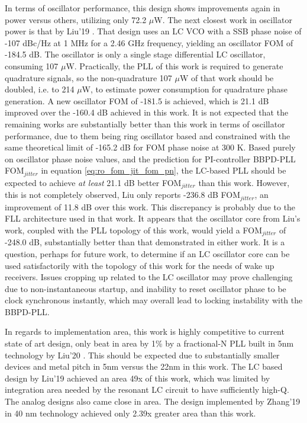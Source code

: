 In terms of oscillator performance, this design shows improvements again in power versus others, utilizing only 72.2 $\mu$W. The next closest work in oscillator power is that by Liu'19 \cite{Liu2019}. That design uses an LC VCO with a SSB phase noise of -107 dBc/Hz at 1 MHz for a 2.46 GHz frequency, yielding an oscillator FOM of -184.5 dB. The oscillator is only a single stage differential LC oscillator, consuming 107 $\mu$W. Practically, the PLL of this work is required to generate quadrature signals, so the non-quadrature 107 $\mu$W of that work should be doubled, i.e. to 214 $\mu$W, to estimate power consumption for quadrature phase generation. A new oscillator FOM of -181.5 is achieved, which is 21.1 dB improved over the -160.4 dB achieved in this work. It is not expected that the remaining works are substantially better than this work in terms of oscillator performance, due to them being ring oscillator based and constrained with the same theoretical limit of -165.2 dB for FOM phase noise at 300 K. Based purely on oscillator phase noise values, and the prediction for PI-controller BBPD-PLL FOM$_{jitter}$ in equation \ref{eq:ro_fom_jit_fom_pn}, the LC-based PLL should be expected to achieve \textit{at least} 21.1 dB better FOM$_{jitter}$ than this work. However, this is not completely observed, Liu only reports -236.8 dB FOM$_{jitter}$, an improvement of 11.8 dB over this work. This discrepancy is probably due to the FLL architecture used in that work. It appears that the oscillator core from Liu's work, coupled with the PLL topology of this work, would yield a FOM$_{jitter}$ of -248.0 dB, substantially better than that demonstrated in either work. It is a question, perhaps for future work, to determine if an LC oscillator core can be used satisfactorily with the topology of this work for the needs of wake up receivers. Issues cropping up related to the LC oscillator may prove challenging due to non-instantaneous startup, and inability to reset oscillator phase to be clock synchronous instantly, which may overall lead to locking instability with the BBPD-PLL. 

In regards to implementation area, this work is highly competitive to current state of art design, only beat in area by 1\% by a fractional-N PLL built in 5nm technology by Liu'20 \cite{Liu2020}. This should be expected due to substantially smaller devices and metal pitch in 5nm versus the 22nm in this work. The LC based design by Liu'19 achieved an area 49x of this work, which was limited by integration area needed by the resonant LC circuit to have sufficiently high-Q. The analog designs also came close in area. The design implemented by Zhang'19 \cite{Zhang2019} in 40 nm technology achieved only 2.39x greater area than this work.

